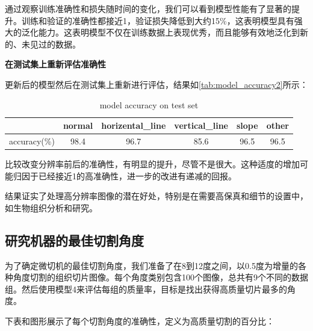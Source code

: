 通过观察训练准确性和损失随时间的变化，我们可以看到模型性能有了显著的提升。训练和验证的准确性都接近1，验证损失降低到大约15\%，这表明模型具有强大的泛化能力。这表明模型不仅在训练数据上表现优秀，而且能够有效地泛化到新的、未见过的数据。

\textbf{在测试集上重新评估准确性}

更新后的模型然后在测试集上重新进行评估，结果如\autoref{tab:model_accuracy2}所示：

\begin{table}
    \centering
    \caption{model accuracy on test set}
    \begin{tabular}{cccccc}
        \toprule
        & normal & horizental\_line & vertical\_line & slope & other \\
        \midrule
        accuracy(\%) & 98.4 & 96.7 & 85.6 & 96.5 & 96.5 \\
        \bottomrule
    \end{tabular}
    \label{tab:model_accuracy2}
    \end{table}

比较改变分辨率前后的准确性，有明显的提升，尽管不是很大。这种适度的增加可能归因于已经接近1的高准确性，进一步的改进有递减的回报。

结果证实了处理高分辨率图像的潜在好处，特别是在需要高保真和细节的设置中，如生物组织分析和研究。

\subsection{研究机器的最佳切割角度}

为了确定微切机的最佳切割角度，我们准备了在8到12度之间，以0.5度为增量的各种角度切割的组织切片图像。每个角度类别包含100个图像，总共有9个不同的数据组。然后使用模型4来评估每组的质量率，目标是找出获得高质量切片最多的角度。

下表和图形展示了每个切割角度的准确性，定义为高质量切割的百分比：

